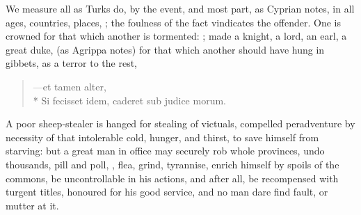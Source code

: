 {We measure all as Turks do, by the event, and most part, as Cyprian
notes, in all ages, countries, places, ; the foulness of the fact vindicates the offender.
One is crowned for that which another is tormented: ; made a knight, a lord, an earl, a
great duke, (as Agrippa notes) for that which another should have
hung in gibbets, as a terror to the rest,

\begin{verse}
\textlatin{---et tamen alter,}\\*
\textlatin{Si fecisset idem, caderet sub judice morum.}
\end{verse}

A poor sheep-stealer is hanged for stealing of victuals, compelled
peradventure by necessity of that intolerable cold, hunger, and thirst,
to save himself from starving: but a great man in office may
securely rob whole provinces, undo thousands, pill and poll, , flea, grind, tyrannise, enrich himself by spoils of the
commons, be uncontrollable in his actions, and after all, be
recompensed with turgent titles, honoured for his good service, and no
man dare find fault, or mutter at it.

}
